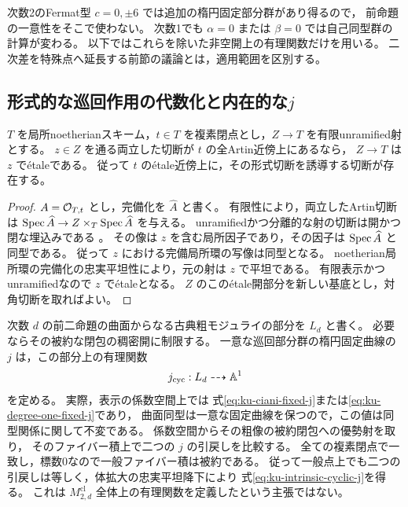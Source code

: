 \begin{remark}[除外した特殊点]
\label{rem:ku-cyclic-exceptional-parameters}
次数2のFermat型 $c=0,\pm6$ では追加の楕円固定部分群があり得るので，
前命題の一意性をそこで使わない。
次数1でも $\alpha=0$ または $\beta=0$ では自己同型群の計算が変わる。
以下ではこれらを除いた非空開上の有理関数だけを用いる。
二次差を特殊点へ延長する前節の議論とは，適用範囲を区別する。
\end{remark}

\subsection{形式的な巡回作用の代数化と内在的な\texorpdfstring{$j$}{j}}

\begin{lemma}[有限unramified空間の形式切断]
\label{lem:ku-finite-unramified-formal-section}
$T$ を局所noetherianスキーム，$t\in T$ を複素閉点とし，$Z\to T$ を有限unramified射とする。
$z\in Z$ を通る両立した切断が $t$ の全Artin近傍上にあるなら，
$Z\to T$ は $z$ で\'{e}taleである。
従って $t$ の\'{e}tale近傍上に，その形式切断を誘導する切断が存在する。
\end{lemma}
\begin{proof}
$A=\mathcal O_{T,t}$ とし，完備化を $\widehat A$ と書く。
有限性により，両立したArtin切断は
$\operatorname{Spec}\widehat A\to Z\times_T\operatorname{Spec}\widehat A$ を与える。
unramifiedかつ分離的な射の切断は開かつ閉な埋込みである
\cite[Tag~024T]{StacksProject}。
その像は $z$ を含む局所因子であり，その因子は $\operatorname{Spec}\widehat A$ と同型である。
従って $z$ における完備局所環の写像は同型となる。
noetherian局所環の完備化の忠実平坦性により，元の射は $z$ で平坦である。
有限表示かつunramifiedなので $z$ で\'{e}taleとなる。
$Z$ のこの\'{e}tale開部分を新しい基底とし，対角切断を取ればよい。
\end{proof}

次数 $d$ の前二命題の曲面からなる古典粗モジュライの部分を $L_d$ と書く。
必要ならその被約な閉包の稠密開に制限する。
一意な巡回部分群の楕円固定曲線の $j$ は，この部分上の有理関数
\begin{equation}\label{eq:ku-intrinsic-cyclic-j}
 j_{\mathrm{cyc}}:L_d\dashrightarrow\mathbb A^1
\end{equation}
を定める。
実際，表示の係数空間上では
式\eqref{eq:ku-ciani-fixed-j}または\eqref{eq:ku-degree-one-fixed-j}であり，
曲面同型は一意な固定曲線を保つので，この値は同型関係に関して不変である。
係数空間からその粗像の被約閉包への優勢射を取り，
そのファイバー積上で二つの $j$ の引戻しを比較する。
全ての複素閉点で一致し，標数0なので一般ファイバー積は被約である。
従って一般点上でも二つの引戻しは等しく，体拡大の忠実平坦降下により
式\eqref{eq:ku-intrinsic-cyclic-j}を得る。
これは $M^{\mathrm{cl}}_{2,d}$ 全体上の有理関数を定義したという主張ではない。

